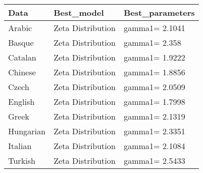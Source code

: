 \begin{table}[ht]
\centering
\begin{tabular}{lll}
  \hline
Data & Best\_model & Best\_parameters \\ 
  \hline
Arabic & Zeta Distribution & gamma1= 2.1041 \\ 
  Basque & Zeta Distribution & gamma1= 2.358 \\ 
  Catalan & Zeta Distribution & gamma1= 1.9222 \\ 
  Chinese & Zeta Distribution & gamma1= 1.8856 \\ 
  Czech & Zeta Distribution & gamma1= 2.0509 \\ 
  English & Zeta Distribution & gamma1= 1.7998 \\ 
  Greek & Zeta Distribution & gamma1= 2.1319 \\ 
  Hungarian & Zeta Distribution & gamma1= 2.3351 \\ 
  Italian & Zeta Distribution & gamma1= 2.1084 \\ 
  Turkish & Zeta Distribution & gamma1= 2.5433 \\ 
   \hline
\end{tabular}
\end{table}
